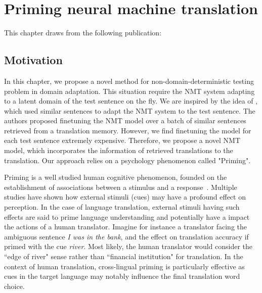 \chapter{Priming neural machine translation}
\label{chap:priming}
This chapter draws from the following publication: \citet{Pham20Priming}
\section{Motivation}
In this chapter, we propose a novel method for non-domain-deterministic testing problem in domain adaptation. This situation require the NMT system adapting to a latent domain of the test sentence on the fly. We are inspired by the idea of \citet{Li18onesentence, Farajian17multidomain}, which used similar sentences to adapt the NMT system to the test sentence. The authors proposed finetuning the NMT model over a batch of similar sentences retrieved from a translation memory. However, we find finetuning the model for each test sentence extremely expensive. Therefore, we propose a novel NMT model, which incorporates the information of retrieved translations to the translation. Our approach relies on a psychology phenomenon called "Priming". 


Priming is a well studied human cognitive phenomenon, founded on the establishment of associations between a stimulus and a response~\cite{Tulving82Priming}. Multiple studies have shown how external stimuli (cues) may have a profound effect on perception.
%
In the case of language translation, external stimuli having such effects are said to prime language understanding and potentially have a impact the actions of a human translator. Imagine for instance a translator facing the ambiguous sentence {\it I was in the bank}, and the effect on translation accuracy if primed with the cue {\it river}. Most likely, the human translator would consider the ``edge of river" sense rather than ``financial institution" for translation. In the context of human translation, cross-lingual priming is particularly effective as cues in the target language may notably influence the final translation word choice.


